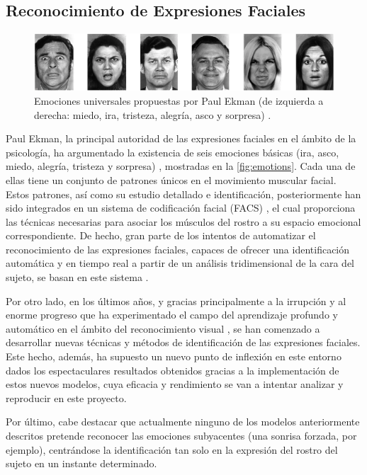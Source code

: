 \subsection{Reconocimiento de Expresiones Faciales}

\begin{figure}
    \centering
    \includegraphics[width=\textwidth]{Images/emotions.png}
    \caption{Emociones universales propuestas por Paul Ekman (de izquierda a derecha: miedo, ira, tristeza, alegría, asco y sorpresa) \cite{Ekman}.}
    \label{fig:emotions}
\end{figure}

Paul Ekman, la principal autoridad de las expresiones faciales en el ámbito de la psicología, ha argumentado la existencia de seis emociones básicas  (ira, asco, miedo, alegría, tristeza y sorpresa) \cite{Ekman}, mostradas en la \autoref{fig:emotions}. Cada una de ellas tiene un conjunto de patrones únicos en el movimiento muscular facial. Estos patrones, así como su estudio detallado e identificación, posteriormente han sido integrados en un sistema de codificación facial (FACS) \cite{FACS}, el cual proporciona las técnicas necesarias para asociar los músculos del rostro a su espacio emocional correspondiente. De hecho, gran parte de los intentos de automatizar el reconocimiento de las expresiones faciales, capaces de ofrecer una identificación automática y en tiempo real a partir de un análisis tridimensional de la cara del sujeto, se basan en este sistema \cite{FaceReader}.

Por otro lado, en los últimos años, y gracias principalmente a la irrupción y al enorme progreso que ha experimentado el campo del aprendizaje profundo y automático en el ámbito del reconocimiento visual \cite{DeepLearning}, se han comenzado a desarrollar nuevas técnicas y métodos de identificación de las expresiones faciales. Este hecho, además, ha supuesto un nuevo punto de inflexión en este entorno dados los espectaculares resultados obtenidos gracias a la implementación de estos nuevos modelos, cuya eficacia y rendimiento se van a intentar analizar y reproducir en este proyecto.

Por último, cabe destacar que actualmente ninguno de los modelos anteriormente descritos pretende reconocer las emociones subyacentes (una sonrisa forzada, por ejemplo), centrándose la identificación tan solo en la expresión del rostro del sujeto en un instante determinado.

